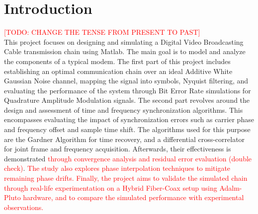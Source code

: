 \section*{Introduction}{}
	\textcolor{red}{[TODO: CHANGE THE TENSE FROM PRESENT TO PAST]}\\
	This project focuses on designing and simulating a Digital Video Broadcasting Cable transmission chain using Matlab.
	The main goal is to model and analyze the components of a typical modem. The first part of this project includes establishing an optimal communication chain over an ideal Additive White Gaussian Noise channel, mapping the signal into symbols, Nyquist filtering, and evaluating the performance of the system through Bit Error Rate simulations for Quadrature Amplitude Modulation signals. The second part revolves around the design and assessment of time and frequency synchronization algorithms. This encompasses evaluating the impact of synchronization errors such as carrier phase and frequency offset and sample time shift. The algorithms used for this purpose are the Gardner Algorithm for time recovery, and a differential cross-correlator for joint frame and frequency acquisition. Afterwards, their effectiveness is demonstrated \textcolor{red}{through convergence analysis and residual error evaluation (double check)}. \textcolor{red}{The study also explores phase interpolation techniques to mitigate remaining phase drifts. Finally, the project aims to validate the simulated chain through real-life experimentation on a Hybrid Fiber-Coax setup using Adalm-Pluto hardware, and to compare the simulated performance with experimental observations.} 

